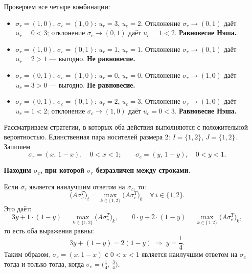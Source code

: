 Проверяем все четыре комбинации:

\begin{itemize}
  \item $\sigma_r = (1,0)$, $\sigma_c = (1,0)$:
        $u_r = 3$, $u_c = 2$.
        Отклонение $\sigma_r \to (0,1)$ даёт $u_r = 0 < 3$;
        отклонение $\sigma_c \to (0,1)$ даёт $u_c = 1 < 2$.
        \textbf{Равновесие Нэша. \checkmark}

  \item $\sigma_r = (1,0)$, $\sigma_c = (0,1)$:
        $u_r = 1$, $u_c = 1$.
        Отклонение $\sigma_r \to (0,1)$ даёт $u_r = 2 > 1$ --- выгодно.
        \textbf{Не равновесие.}

  \item $\sigma_r = (0,1)$, $\sigma_c = (1,0)$:
        $u_r = 0$, $u_c = 0$.
        Отклонение $\sigma_r \to (1,0)$ даёт $u_r = 3 > 0$ --- выгодно.
        \textbf{Не равновесие.}

  \item $\sigma_r = (0,1)$, $\sigma_c = (0,1)$:
        $u_r = 2$, $u_c = 3$.
        Отклонение $\sigma_r \to (1,0)$ даёт $u_r = 1 < 2$;
        отклонение $\sigma_c \to (1,0)$ даёт $u_c = 0 < 3$.
        \textbf{Равновесие Нэша. \checkmark}
\end{itemize}

Рассматриваем стратегии, в которых оба действия выполняются с
положительной вероятностью.
Единственная пара носителей размера $2$:
$I = \{1,2\}$, $J = \{1,2\}$.
Запишем
\begin{equation}
\sigma_r = (x,\,1-x), \quad 0 < x < 1;
  \qquad
  \sigma_c = (y,\,1-y), \quad 0 < y < 1.
\end{equation}

\noindent\textbf{Находим $\sigma_c$, при которой $\sigma_r$ безразличен
между строками.}

Если $\sigma_r$ является наилучшим ответом на $\sigma_c$, то:
\begin{equation}
\bigl(A\sigma_c^T\bigr)_i = \max_{k\in\{1,2\}}\bigl(A\sigma_c^T\bigr)_k
  \quad \forall\, i \in \{1,2\}.
\end{equation}
Это даёт:
\begin{equation}
3y + 1\cdot(1-y) = \max_{k\in\{1,2\}}\bigl(A\sigma_c^T\bigr)_k,
  \qquad
  0\cdot y + 2\cdot(1-y) = \max_{k\in\{1,2\}}\bigl(A\sigma_c^T\bigr)_k,
\end{equation}
то есть оба выражения равны:
\begin{equation}
3y + (1-y) = 2(1-y)
  \;\Longrightarrow\;
  y = \frac{1}{4}.
\end{equation}
Таким образом, $\sigma_r = (x,1-x)$ с $0 < x < 1$ является
наилучшим ответом на $\sigma_c$ тогда и только тогда, когда
$\sigma_c = \bigl(\tfrac{1}{4},\,\tfrac{3}{4}\bigr)$.

